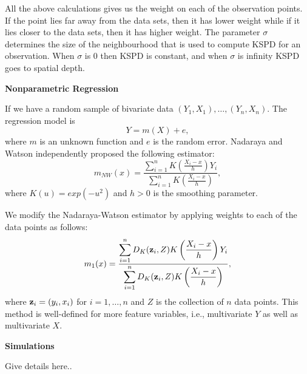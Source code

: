 \documentclass[11pt]{article}
\newcommand{\zvec}{\mbox{\bf z}}
\begin{document}
\begin{flushleft}
All the above calculations gives us the weight on each of the observation points. If the point lies far away from the data sets, then it has lower weight while if it lies closer to the data sets, then it has higher weight. 
The parameter $\sigma$ determines the size of the neighbourhood that is used to compute KSPD for an observation. When $\sigma$ is 0 then KSPD is constant, and when $\sigma$ is infinity KSPD goes to spatial depth.

\newpage
\vspace{0.1in}
\textbf{Nonparametric Regression}
\vspace{0.1in}

If we have a random sample of bivariate data $(Y_1,X_1),\ldots,(Y_n,X_n)$. The regression model is 
$$Y = m(X) + e,$$ 
where $m$ is an unknown function and $e$ is the random error. Nadaraya and Watson independently proposed the following estimator: 
$$m_{NW}(x)=\frac{\displaystyle{ \sum\limits_{i=1}^n K \left( \frac{X_i-x}{h} \right) Y_i}}{\displaystyle{ \sum\limits_{i=1}^n K \left( \frac{X_i-x}{h}\right )}},$$
where $K(u)=exp(-u^2)$ and $h>0$ is the smoothing parameter.

We modify the Nadaraya-Watson estimator by applying weights to each of the data points as follows:
$$m_{1}(x)= \frac{\displaystyle{ \sum\limits_{i=1}^n D_K(\zvec_i,Z) K\left( \frac{X_i-x}{h} \right) Y_i}}{\displaystyle{ \sum\limits_{i=1}^n D_K(\zvec_i,Z) K\left( \frac{X_i-x}{h}\right )}},$$
where $\zvec_i=(y_i,x_i)$ for $i=1,\ldots,n$ and $Z$ is the collection of $n$ data points. 
This method is well-defined for more feature variables, i.e., multivariate $Y$ as well as multivariate $X$.

\vspace{0.1in}
\textbf{Simulations}
\vspace{0.1in}

{\color{red} Give details here..}


\end{flushleft}
\end{document}
